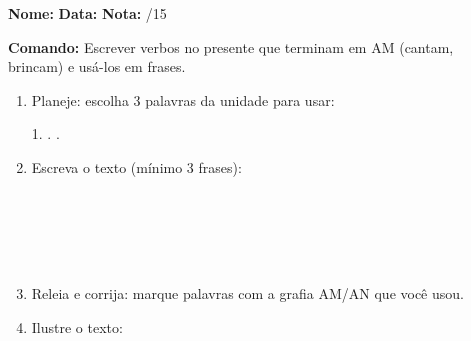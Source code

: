 \begin{exercicio}

\noindent\textbf{Nome:} \underline{\hspace{3.2cm}} \quad \textbf{Data:} \underline{\hspace{1.6cm}} \quad \textbf{Nota:} \underline{\hspace{0.9cm}}/15


\noindent\textbf{Comando:} Escrever verbos no presente que terminam em AM (cantam, brincam) e usá-los em frases.


\begin{enumerate}

  \item Planeje: escolha 3 palavras da unidade para usar:
  \begin{center}
  1. \underline{\hspace{3cm}} . \underline{\hspace{3cm}} . \underline{\hspace{3cm}}
  \end{center}

  \item Escreva o texto (mínimo 3 frases):
  \begin{center}
  \underline{\hspace{12cm}}\\\underline{\hspace{12cm}}\\\underline{\hspace{12cm}}\\\underline{\hspace{12cm}}\\\underline{\hspace{12cm}}
  \end{center}

  \item Releia e corrija: marque palavras com a grafia AM/AN que você usou.

  \item Ilustre o texto:
  \begin{center}
  \end{center}

\end{enumerate}

\end{exercicio}

